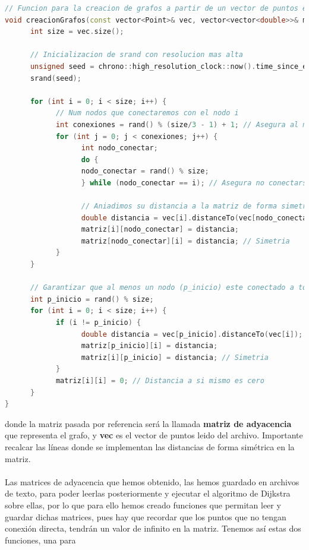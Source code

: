 \documentclass[11pt,openany]{book}
\begin{document}
\begin{lstlisting}[language=C++]
// Funcion para la creacion de grafos a partir de un vector de puntos en 2D
void creacionGrafos(const vector<Point>& vec, vector<vector<double>>& matriz) {
      int size = vec.size();
      
      // Inicializacion de srand con resolucion mas alta
      unsigned seed = chrono::high_resolution_clock::now().time_since_epoch().count();
      srand(seed);
      
      for (int i = 0; i < size; i++) {
            // Num nodos que conectaremos con el nodo i
            int conexiones = rand() % (size/3 - 1) + 1; // Asegura al menos una conexion por nodo
            for (int j = 0; j < conexiones; j++) {
                  int nodo_conectar;
                  do {
                  nodo_conectar = rand() % size;
                  } while (nodo_conectar == i); // Asegura no conectarse a si mismo
      
                  // Aniadimos su distancia a la matriz de forma simetrica
                  double distancia = vec[i].distanceTo(vec[nodo_conectar]);
                  matriz[i][nodo_conectar] = distancia;
                  matriz[nodo_conectar][i] = distancia; // Simetria
            }
      }
      
      // Garantizar que al menos un nodo (p_inicio) este conectado a todos los demas
      int p_inicio = rand() % size;
      for (int i = 0; i < size; i++) {
            if (i != p_inicio) {
                  double distancia = vec[p_inicio].distanceTo(vec[i]);
                  matriz[p_inicio][i] = distancia;
                  matriz[i][p_inicio] = distancia; // Simetria
            }
            matriz[i][i] = 0; // Distancia a si mismo es cero
      }
}
\end{lstlisting}
donde la matriz pasada por referencia será la llamada \textbf{matriz de adyacencia} que representa el grafo, y \textbf{vec} es el vector de puntos
leido del archivo. Importante recalcar las líneas donde se implementan las distancias de forma simétrica en la matriz.\\ \\
Las matrices de adyacencia que hemos obtenido, las hemos guardado en archivos de texto, para poder leerlas posteriormente y ejecutar
el algoritmo de Dijkstra sobre ellas, por lo que para ello hemos creado funciones que permitan leer y guardar dichas matrices, pues hay que recordar que 
los puntos que no tengan conexión directa, tendrán un valor de infinito en la matriz. Tenemos así estas dos funciones, una para 
\end{document}

